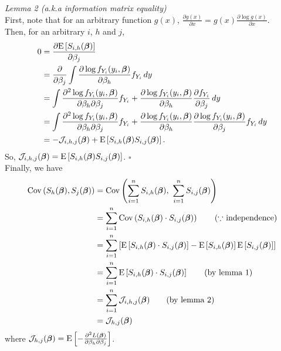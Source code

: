 \textit{Lemma 2 (a.k.a information matrix equality)}\\
First, note that for an arbitrary function $g(x)$, $\frac{\partial g(x)}{\partial x} = g(x)\frac{\partial \log g(x)}{\partial x}$.\\
Then, for an arbitrary $i$, $h$ and $j$,
\begin{align*}
0 &= \frac{\partial \mathrm{E}\left[S_{i,h}(\bm{\beta})\right]}{\partial \beta_{j}}\\
&= \frac{\partial}{\partial \beta_{j}} \int \frac{\partial \log f_{Y_{i}}(y_{i},\bm{\beta})}{\partial \beta_{h}} f_{Y_{i}} \,dy\\
&= \int \frac{\partial^{2} \log f_{Y_{i}}(y_{i},\bm{\beta})}{\partial \beta_{h} \partial \beta_{j}}f_{Y_{i}} +\frac{\partial \log f_{Y_{i}}(y_{i},\bm{\beta})}{\partial \beta_{h}}\frac{\partial f_{Y_{i}}}{\partial \beta_{j}} \,dy\\
&= \int \frac{\partial^{2} \log f_{Y_{i}}(y_{i},\bm{\beta})}{\partial \beta_{h} \partial \beta_{j}}f_{Y_{i}} +\frac{\partial \log f_{Y_{i}}(y_{i},\bm{\beta})}{\partial \beta_{h}}\frac{\partial \log f_{Y_{i}}(y_{i},\bm{\beta})}{\partial \beta_{j}}f_{Y_{i}} \,dy\\
&= -\mathcal{J}_{i,h,j}(\bm{\beta}) + \mathrm{E}\left[S_{i,h}(\bm{\beta})S_{i,j}(\bm{\beta})\right].
\end{align*}
So, $\mathcal{J}_{i,h,j}(\bm{\beta}) = \mathrm{E}\left[S_{i,h}(\bm{\beta})S_{i,j}(\bm{\beta})\right]$.
\hfill\ensuremath{\square}\\

Finally, we have
\begin{align*}
\mathrm{Cov}\left(S_{h}(\bm{\beta}), S_{j}(\bm{\beta})\right) &= \mathrm{Cov}\left(\sum_{i=1}^{n}S_{i,h}(\bm{\beta}),~ \sum_{i=1}^{n}S_{i,j}(\bm{\beta})\right)\\
&= \sum_{i=1}^{n} \mathrm{Cov}\left(S_{i,h}(\bm{\beta}) \cdot S_{i,j}(\bm{\beta})\right) \tag{$\because$ independence}\\
&= \sum_{i=1}^{n} \left[\mathrm{E}\left[S_{i,h}(\bm{\beta}) \cdot S_{i,j}(\bm{\beta})\right] - \mathrm{E}\left[S_{i,h}(\bm{\beta})\right] \mathrm{E}\left[S_{i,j}(\bm{\beta})\right]\right]\\
&= \sum_{i=1}^{n}\mathrm{E}\left[S_{i,h}(\bm{\beta}) \cdot S_{i,j}(\bm{\beta})\right] \tag{by lemma 1}\\
&= \sum_{i=1}^{n} \mathcal{J}_{i,h,j}(\bm{\beta}) \tag{by lemma 2}\\
&= \mathcal{J}_{h,j}(\bm{\beta})
\end{align*}
where $\mathcal{J}_{h,j}(\bm{\beta}) = \mathrm{E}\left[-\frac{\partial^{2} L(\bm{\beta})}{\partial \beta_{h} \partial \beta_{j}} \right]$.\\

